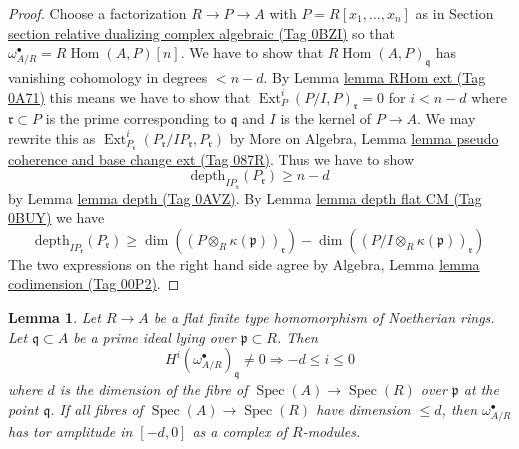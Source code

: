 \documentclass{amsart}
\theoremstyle{plain}
\newtheorem{lemma}[subsection]{Lemma}
\theoremstyle{definition}
\theoremstyle{remark}
\numberwithin{equation}{subsection}
\def\Spec{\mathop{\mathrm{Spec}}}
\def\Hom{\mathop{\mathrm{Hom}}\nolimits}
\def\Ext{\mathop{\mathrm{Ext}}\nolimits}
\begin{document}
\begin{proof}
Choose a factorization $R \to P \to A$ with $P = R[x_1, \ldots, x_n]$
as in Section \href{https://stacks.math.columbia.edu/tag/0BZI}{section relative dualizing complex algebraic (Tag 0BZI)}
so that $\omega_{A/R}^\bullet = R\Hom(A, P)[n]$.
We have to show that $R\Hom(A, P)_\mathfrak q$
has vanishing cohomology in degrees $< n - d$.
By Lemma \href{https://stacks.math.columbia.edu/tag/0A71}{lemma RHom ext (Tag 0A71)} this means we have to
show that $\Ext_P^i(P/I, P)_{\mathfrak r} = 0$ for $i < n - d$
where $\mathfrak r \subset P$ is the prime corresponding to $\mathfrak q$
and $I$ is the kernel of $P \to A$.
We may rewrite this as
$\Ext_{P_\mathfrak r}^i(P_\mathfrak r/IP_\mathfrak r, P_\mathfrak r)$
by More on Algebra, Lemma
\href{https://stacks.math.columbia.edu/tag/087R}{lemma pseudo coherence and base change ext (Tag 087R)}.
Thus we have to show
$$
\text{depth}_{IP_\mathfrak r}(P_\mathfrak r) \geq n - d
$$
by Lemma \href{https://stacks.math.columbia.edu/tag/0AVZ}{lemma depth (Tag 0AVZ)}.
By Lemma \href{https://stacks.math.columbia.edu/tag/0BUY}{lemma depth flat CM (Tag 0BUY)} we have
$$
\text{depth}_{IP_\mathfrak r}(P_\mathfrak r) \geq
\dim((P \otimes_R \kappa(\mathfrak p))_\mathfrak r) -
\dim((P/I \otimes_R \kappa(\mathfrak p))_\mathfrak r)
$$
The two expressions on the right hand side agree by
Algebra, Lemma \href{https://stacks.math.columbia.edu/tag/00P2}{lemma codimension (Tag 00P2)}.
\end{proof}

\begin{lemma}
\label{lemma-relative-dualizing-flat-vanishing}
Let $R \to A$ be a flat finite type homomorphism of Noetherian rings.
Let $\mathfrak q \subset A$ be a prime ideal lying over
$\mathfrak p \subset R$. Then
$$
H^i(\omega_{A/R}^\bullet)_\mathfrak q \not = 0
\Rightarrow - d \leq i \leq 0
$$
where $d$ is the dimension of the fibre of $\Spec(A) \to \Spec(R)$
over $\mathfrak p$ at the point $\mathfrak q$. If all fibres of
$\Spec(A) \to \Spec(R)$ have dimension $\leq d$, then
$\omega_{A/R}^\bullet$ has tor amplitude in $[-d, 0]$
as a complex of $R$-modules.
\end{lemma}
\end{document}
